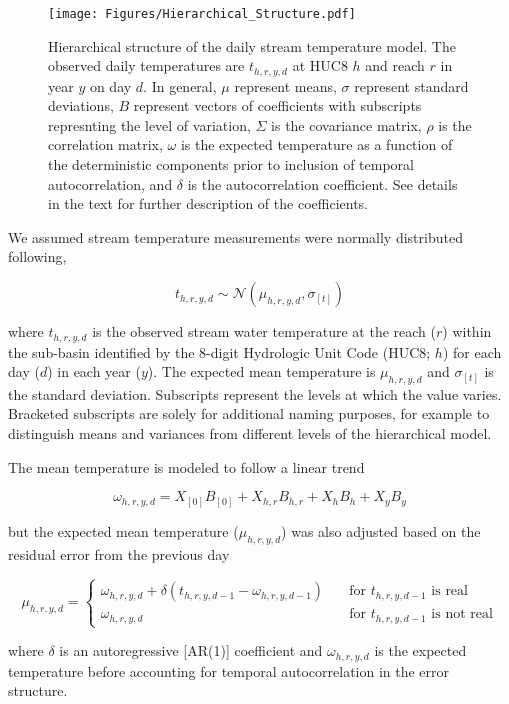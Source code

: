 \documentclass[]{article}
\begin{document}
\begin{figure}[htbp]
\centering
\texttt{[image: Figures/Hierarchical\_Structure.pdf]}
\caption{Hierarchical structure of the daily stream temperature model.
The observed daily temperatures are \(t_{h,r,y,d}\) at HUC8 \(h\) and
reach \(r\) in year \(y\) on day \(d\). In general, \(\mu\) represent
means, \(\sigma\) represent standard deviations, \(B\) represent vectors
of coefficients with subscripts represnting the level of variation,
\(\Sigma\) is the covariance matrix, \(\rho\) is the correlation matrix,
\(\omega\) is the expected temperature as a function of the
deterministic components prior to inclusion of temporal autocorrelation,
and \(\delta\) is the autocorrelation coefficient. See details in the
text for further description of the coefficients.}
\end{figure}

We assumed stream temperature measurements were normally distributed
following,

\[ t_{h,r,y,d} \sim \mathcal{N}(\mu_{h,r,y,d}, \sigma_{[t]}) \]

where \(t_{h,r,y,d}\) is the observed stream water temperature at the
reach (\(r\)) within the sub-basin identified by the 8-digit Hydrologic
Unit Code (HUC8; \(h\)) for each day (\(d\)) in each year (\(y\)). The
expected mean temperature is \(\mu_{h,r,y,d}\) and \(\sigma_{[t]}\) is
the standard deviation. Subscripts represent the levels at which the
value varies. Bracketed subscripts are solely for additional naming
purposes, for example to distinguish means and variances from different
levels of the hierarchical model.

The mean temperature is modeled to follow a linear trend

\[ \omega_{h,r,y,d} = X_{[0]} B_{[0]} + X_{h,r} B_{h,r} + X_{h} B_{h} + X_{y} B_{y} \]

but the expected mean temperature (\(\mu_{h,r,y,d}\)) was also adjusted
based on the residual error from the previous day

\[ \mu_{h,r,y,d} = \begin{cases}
    \omega_{h,r,y,d} + \delta(t_{h,r,y,d-1} - \omega_{h,r,y,d-1}) & \quad  \text{for $t_{h,r,y,d-1}$ is real} \\
    \omega_{h,r,y,d} & \quad  \text{for $t_{h,r,y,d-1}$ is not real}
  \end{cases}
 \]

where \(\delta\) is an autoregressive {[}AR(1){]} coefficient and
\(\omega_{h,r,y,d}\) is the expected temperature before accounting for
temporal autocorrelation in the error structure.
\end{document}

